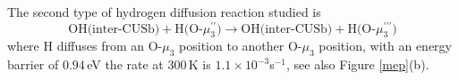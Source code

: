 \documentclass[11pt,DIV=13,BCOR=5mm,a4paper,headinclude]{scrbook}
\begin{document}
The second type of hydrogen diffusion reaction studied is
\begin{equation}
 \text{OH(inter-CUSb)} + \text{H(O-$\mu_3^{\prime\prime}$)} \rightarrow \text{OH(inter-CUSb)} + \text{H(O-$\mu_3^{\prime\prime\prime}$)} \tag{Df-H-VI}
     \label{diffHd}
\end{equation}
where H diffuses from an O-$\mu_3$ position to another O-$\mu_3$ position, with an energy barrier of $0.94\,$eV the rate at $300\,$K is $1.1\times 10^{-3}$s$^{-1}$, see also Figure \ref{mep}(b).

% 
\end{document}
